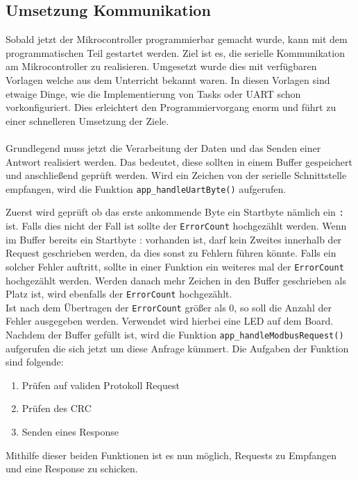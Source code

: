 \subsection{Umsetzung Kommunikation} \label{ssec:konzeptCardDeal}
Sobald jetzt der Mikrocontroller programmierbar gemacht wurde, kann mit dem programmatischen Teil gestartet werden.
Ziel ist es, die serielle Kommunikation am Mikrocontroller zu realisieren.
Umgesetzt wurde dies mit verfügbaren Vorlagen welche aus dem Unterricht bekannt waren.
In diesen Vorlagen sind etwaige Dinge, wie die Implementierung von Tasks oder UART schon vorkonfiguriert.
Dies erleichtert den Programmiervorgang enorm und führt zu einer schnelleren Umsetzung der Ziele.\\\\
Grundlegend muss jetzt die Verarbeitung der Daten und das Senden einer Antwort realisiert werden.
Das bedeutet, diese sollten in einem Buffer gespeichert und anschließend geprüft werden.
Wird ein Zeichen von der serielle Schnittstelle empfangen, wird die Funktion \lstinline[style=C]{app_handleUartByte()} aufgerufen.

Zuerst wird geprüft ob das erste ankommende Byte ein Startbyte nämlich ein \lstinline[style=C]{:} ist.
Falls dies nicht der Fall ist sollte der \lstinline[style=C]{ErrorCount} hochgezählt werden.
Wenn im Buffer bereits ein Startbyte : vorhanden ist, darf kein Zweites innerhalb der Request geschrieben werden, da dies sonst zu Fehlern führen könnte.
Falls ein solcher Fehler auftritt, sollte in einer Funktion ein weiteres mal der \lstinline[style=C]{ErrorCount} hochgezählt werden.
Werden danach mehr Zeichen in den Buffer geschrieben als Platz ist, wird ebenfalls der \lstinline[style=C]{ErrorCount} hochgezählt.\\
Ist nach dem Übertragen der \lstinline[style=C]{ErrorCount} größer als 0, so soll die Anzahl der Fehler ausgegeben werden.
Verwendet wird hierbei eine LED auf dem Board.\\
Nachdem der Buffer gefüllt ist, wird die Funktion \lstinline[style=C]{app_handleModbusRequest()} aufgerufen die sich jetzt um diese Anfrage kümmert.
Die Aufgaben der Funktion sind folgende:
\begin{enumerate}
\item Prüfen auf validen Protokoll Request
\item Prüfen des CRC
\item Senden eines Response
\end{enumerate}
Mithilfe dieser beiden Funktionen ist es nun möglich, Requests zu Empfangen und eine Response zu schicken.
